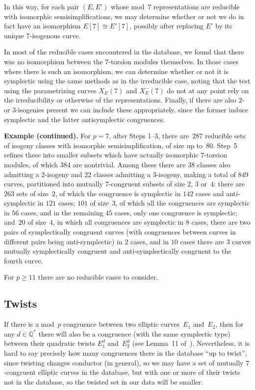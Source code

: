 \documentclass[twoside,leqno,symbols-for-thanks, draft]{rmi}
\numberwithin{equation}{section}
\newcommand{\Q}{\mathbb{Q}}
\theoremstyle{remark}
\begin{document}
In this way, for each pair $(E,E')$ whose 
mod~$7$ representations
are reducible with isomorphic semisimplifications, we may determine
whether or not we do in fact have an isomorphism $E[7]\cong E'[7]$,
possibly after replacing $E'$ by its unique $7$-isogenous curve.

In most of the reducible cases encountered in the database, we found
that there was no isomorphism between the $7$-torsion modules
themselves.  In those cases where there is such an isomorphism, we can
determine whether or not it is symplectic using the same methods as in
the irreducible case, noting that the test using the parametrizing
curves $X_E(7)$ and $X_E^-(7)$ do not at any point rely on the
irreducibility or otherwise of the representations.  Finally, if there
are also $2$-{} or $3$-isogenies present we can include these
appropriately, since the former induce symplectic and the latter
antisymplectic congruences.

{\bf Example (continued).} For $p=7$, after Steps 1--3, there
are~$287$ reducible sets of isogeny classes with isomorphic
semisimplification, of size up to~$80$.  Step~5 refines these into
smaller subsets which have actually isomorphic $7$-torsion modules, of
which $384$ are nontrivial.  Among these there are $38$ classes also
admitting a $2$-isogeny and $22$ classes admitting a $3$-isogeny,
making a total of $849$ curves, partitioned into mutually
$7$-congruent subsets of size $2$, $3$ or~$4$: there are $263$ sets of
size~$2$, of which the congruence is symplectic in $142$ cases and
anti-symplectic in $121$ cases; $101$ of size~$3$, of which all the
congruences are symplectic in $56$ cases, and in the remaining $45$
cases, only one congruence is symplectic; and~$20$ of size~$4$, in
which all congruences are symplectic in $8$ cases, there are two pairs
of symplectically congruent curves (with congruences between curves in
different pairs being anti-symplectic) in $2$ cases, and in $10$ cases
there are $3$ curves mutually symplectically congruent and
anti-symplectically congruent to the fourth curve.

For $p\ge11$ there are no reducible cases to consider.

\subsection{Twists}
If there is a mod~$p$ congruence between two elliptic curves~$E_1$
and~$E_2$, then for any $d\in\Q^*$ there will also be a congruence
(with the same symplectic type) between their quadratic twists
$E_1^d$ and~$E_2^d$ (see Lemma~11 of~\cite{FKSym}).
Nevertheless, it is hard to say precisely how many congruences there
in the database ``up to twist'', since twisting changes conductor (in
general), so we may have a set of mutually $7$-congruent elliptic
curves in the database, but with one or more of their twists not in
the database, so the twisted set in our data will be smaller.
\end{document}
